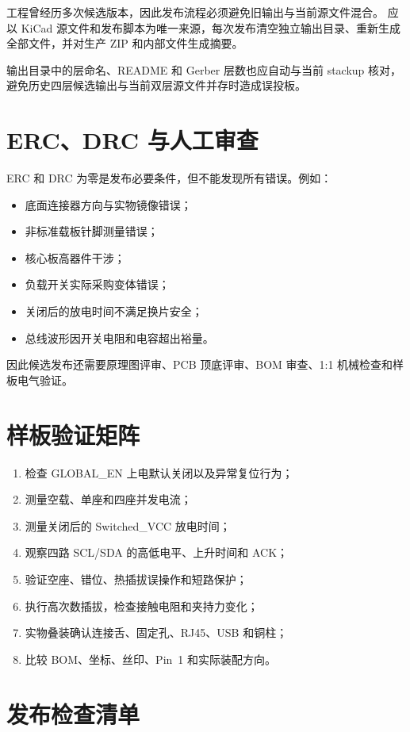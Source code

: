 工程曾经历多次候选版本，因此发布流程必须避免旧输出与当前源文件混合。
应以 KiCad 源文件和发布脚本为唯一来源，每次发布清空独立输出目录、重新生成全部文件，并对生产 ZIP 和内部文件生成摘要。

输出目录中的层命名、README 和 Gerber 层数也应自动与当前 stackup 核对，避免历史四层候选输出与当前双层源文件并存时造成误投板。

\section{ERC、DRC 与人工审查}

ERC 和 DRC 为零是发布必要条件，但不能发现所有错误。例如：
\begin{itemize}
  \item 底面连接器方向与实物镜像错误；
  \item 非标准载板针脚测量错误；
  \item 核心板高器件干涉；
  \item 负载开关实际采购变体错误；
  \item 关闭后的放电时间不满足换片安全；
  \item 总线波形因开关电阻和电容超出裕量。
\end{itemize}

因此候选发布还需要原理图评审、PCB 顶底评审、BOM 审查、1:1 机械检查和样板电气验证。

\section{样板验证矩阵}

\begin{enumerate}
  \item 检查 GLOBAL\_EN 上电默认关闭以及异常复位行为；
  \item 测量空载、单座和四座并发电流；
  \item 测量关闭后的 Switched\_VCC 放电时间；
  \item 观察四路 SCL/SDA 的高低电平、上升时间和 ACK；
  \item 验证空座、错位、热插拔误操作和短路保护；
  \item 执行高次数插拔，检查接触电阻和夹持力变化；
  \item 实物叠装确认连接舌、固定孔、RJ45、USB 和铜柱；
  \item 比较 BOM、坐标、丝印、Pin~1 和实际装配方向。
\end{enumerate}

\section{发布检查清单}

